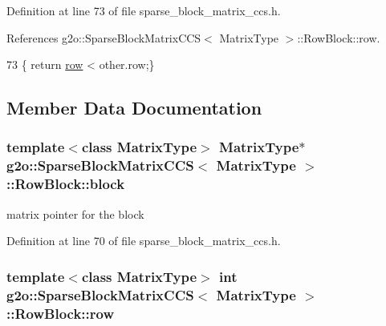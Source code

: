 Definition at line 73 of file sparse\+\_\+block\+\_\+matrix\+\_\+ccs.\+h.



References g2o\+::\+Sparse\+Block\+Matrix\+C\+C\+S$<$ Matrix\+Type $>$\+::\+Row\+Block\+::row.


\begin{DoxyCode}
73 \{ \textcolor{keywordflow}{return} \hyperlink{structg2o_1_1SparseBlockMatrixCCS_1_1RowBlock_af414f235d5aa28ca1508cfa0860c4949}{row} < other.row;\}
\end{DoxyCode}


\subsection{Member Data Documentation}
\subsubsection[{\texorpdfstring{block}{block}}]{\setlength{\rightskip}{0pt plus 5cm}template$<$class Matrix\+Type$>$ Matrix\+Type$\ast$ {\bf g2o\+::\+Sparse\+Block\+Matrix\+C\+CS}$<$ Matrix\+Type $>$\+::Row\+Block\+::block}\hypertarget{structg2o_1_1SparseBlockMatrixCCS_1_1RowBlock_a88ab75d0e29496d3ca023105256a2926}{}\label{structg2o_1_1SparseBlockMatrixCCS_1_1RowBlock_a88ab75d0e29496d3ca023105256a2926}


matrix pointer for the block 



Definition at line 70 of file sparse\+\_\+block\+\_\+matrix\+\_\+ccs.\+h.

\subsubsection[{\texorpdfstring{row}{row}}]{\setlength{\rightskip}{0pt plus 5cm}template$<$class Matrix\+Type$>$ int {\bf g2o\+::\+Sparse\+Block\+Matrix\+C\+CS}$<$ Matrix\+Type $>$\+::Row\+Block\+::row}\hypertarget{structg2o_1_1SparseBlockMatrixCCS_1_1RowBlock_af414f235d5aa28ca1508cfa0860c4949}{}\label{structg2o_1_1SparseBlockMatrixCCS_1_1RowBlock_af414f235d5aa28ca1508cfa0860c4949}


